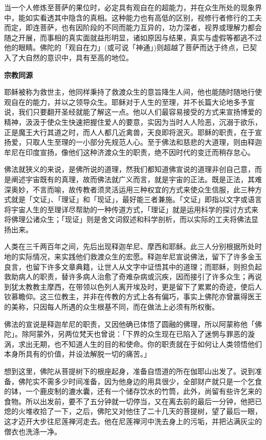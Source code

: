 \documentclass[twoside,openany]{book}
\newcommand{\mt}[1]{\textbullet \textbf{#1}}
\begin{document}
当一个人修炼至菩萨的果位时，必定具有观自在的超能力，并在众生所处的现象界中，能如实看透其中隐含的真相。这种能力也有高低的区别，视修行者修行的工夫而定，即连菩萨，也有因阶段的不同而能力互异的，功力深者，视界或理解力都会随之开展，而事相的真实面就益形明显，诸如原因与结果，真实与虚假等都逃不过他的眼睛。佛陀的「观自在力」(或可说「神通」)则超越了菩萨而达于终点，已契入了大自然的意识中，具有至高的地位。

\mt{宗教同源}

耶稣被称为救世主，他同样秉持了救渡众生的意旨降生人间，他也能随时随地行使观自在的能力，并以之领导众生。耶稣对于人生的至理，并不长篇大论地多予宣说，我们只要翻开圣经就能了解这一点。他以人们最容易接受的方式来宣扬博爱的精神，汲汲于使众生快速把握住爱人的要意，实因为当时人人险恶，沉溺于欲乐，正是魔王大行其道之时，而人人都几近禽兽，天良即将泯灭。耶稣的职责，在于宣扬爱，只取人生至理的一小部分先规范人心。至于佛法和慈悲的大道理，则由释迦牟尼在印度宣扬，像他们这种济渡众生的职责，绝不因时代的变迁而稍存怠心。

佛法就狭义的来说，是佛所说的道理，然我们都知道佛宣说的道理非创自己意，而是阐述宇宙既有的真理，故而佛法就广义而言，就是宇宙的正法。既是正法，其难深奥妙，不言而喻，故传教者须灵活运用三种权宜的方式来使众生信服，此三种方式就是「文证」、「理证」和「现证」，最好能三者兼施。「文证」即指以文字或语言将宇宙人生的至理详尽帮助的一种传道方式，「理证」就是运用科学的探讨方式来将佛理公诸众生；「现证」则是舍文词叙述和科学剖析，而以实际的工夫将佛法显扬出来。

人类在三千两百年之间，先后出现释迦牟尼、摩西和耶稣。此三人分别根据所处时地的实际情况，来实践他们救渡众生的宏愿。释迦牟尼宣说佛法，留下了许多金玉良言，也留下许多文章典籍，让世人从文字中证悟其中的道理；而耶稣，则担负起救助病人的职责，替许多病人治愈了奇难杂病或沉疾，因而接引了许多众生；再说到犹太教教主摩西，在带领以色列人离开埃及时，更是留下了累累的奇迹，使后人钦慕瞻仰。这三位教主，并非在传教的方式上各有偏巧，事实上佛陀亦曾赢得医王的美称，只因每人所遇的众生根基不同，而在做法上必须有所权衡。

佛法的宣说是释迦牟尼的职责，又因他确已体悟了圆融的佛理，所以阿蒙称他「佛陀」。除阿蒙外，另两位梵天也曾说：「下界的众生现在已陷入了迷惘与罪恶的漩涡，求出无期，也不知道人生的目的和使命。你的职责就在于如何让人类领悟他们本身所具有的价值，并设法解脱一切的痛苦。」

想到这里，佛陀从菩提树下的根座起身，准备自悟道的所在伽耶山出发了。说到准备，佛陀实不需多少时间准备，因为他身边的用具很少，全部财产就只是一个乞食的钵，一个鹿皮制的漉水囊，还有一个储存饮水的竹筒，此外，尚留有些许乞来的食物。所以出发前，要不了五分钟就一切停当，又在离去前的最后一分钟，他把已熄的火堆收拾了一下，之后，佛陀又对他住了二十几天的菩提树，望了最后一眼，这才迈开大步往尼莲禅河走去。他在尼莲禅河中洗去身上的污垢，并把沾满灰尘的僧衣也洗涤一净。
\end{document}
